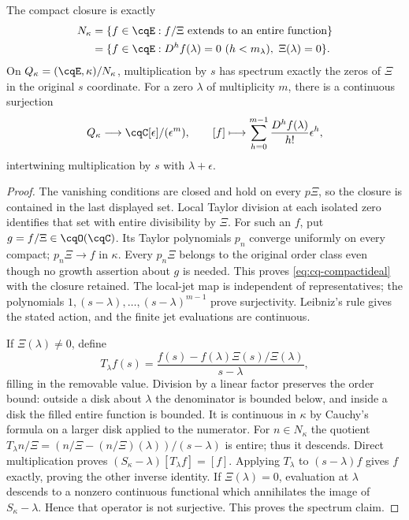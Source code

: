 \begin{cqtheorem}
\label{thm:cq-compact}
The compact closure is exactly
\begin{equation}\label{eq:cq-compactideal}
 \begin{aligned}
 N_\kappa
 &=\{f\in\cqE:f/\Xi\text{ extends to an entire function}\}\\
 &=\{f\in\cqE:D^hf(\lambda)=0\ (h<m_\lambda),\ \Xi(\lambda)=0\}.
 \end{aligned}
\end{equation}
On $Q_\kappa=(\cqE,\kappa)/N_\kappa$, multiplication by $s$ has
spectrum exactly the zeros of $\Xi$ in the original $s$ coordinate.
For a zero $\lambda$ of multiplicity $m$, there is a continuous
surjection
\[
 Q_\kappa\longrightarrow\cqC[\epsilon]/(\epsilon^m),\qquad
 [f]\longmapsto\sum_{h=0}^{m-1}\frac{D^hf(\lambda)}{h!}\epsilon^h,
\]
intertwining multiplication by $s$ with $\lambda+\epsilon$.
\end{cqtheorem}
\begin{proof}
The vanishing conditions are closed and hold on every $p\Xi$,
so the closure is contained in the last displayed set. Local Taylor
division at each isolated zero identifies that set with entire
divisibility by $\Xi$. For such an $f$, put $g=f/\Xi\in\cqO(\cqC)$.
Its Taylor polynomials $p_n$ converge uniformly on every compact;
$p_n\Xi\to f$ in $\kappa$. Every $p_n\Xi$ belongs to the original
order class even though no growth assertion about $g$ is needed.
This proves \eqref{eq:cq-compactideal} with the closure retained.
The local-jet map is independent of representatives; the polynomials
$1,(s-\lambda),\ldots,(s-\lambda)^{m-1}$ prove surjectivity.
Leibniz's rule gives the stated action, and the finite jet evaluations
are continuous.

If $\Xi(\lambda)\ne0$, define
\[
 T_\lambda f(s)=
 \frac{f(s)-f(\lambda)\Xi(s)/\Xi(\lambda)}{s-\lambda},
\]
filling in the removable value. Division by a linear factor preserves
the order bound: outside a disk about $\lambda$ the denominator is
bounded below, and inside a disk the filled entire function is bounded.
It is continuous in $\kappa$ by Cauchy's formula on a larger disk
applied to the numerator. For $n\in N_\kappa$ the quotient
$T_\lambda n/\Xi=(n/\Xi-(n/\Xi)(\lambda))/(s-\lambda)$ is entire;
thus it descends. Direct multiplication proves
$(S_\kappa-\lambda)[T_\lambda f]=[f]$.
Applying $T_\lambda$ to $(s-\lambda)f$ gives $f$ exactly, proving
the other inverse identity. If $\Xi(\lambda)=0$, evaluation at
$\lambda$ descends to a nonzero continuous functional which annihilates
the image of $S_\kappa-\lambda$. Hence that operator is not
surjective. This proves the spectrum claim.
\end{proof}

